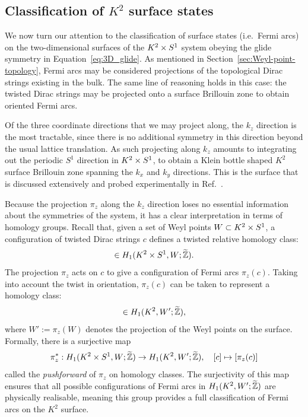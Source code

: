 \subsection{Classification of \texorpdfstring{$K^2$}{K²} surface states}

We now turn our attention to the classification of surface states (i.e.\ Fermi arcs) on the two-dimensional surfaces of the $K^2\times S^1$ system obeying the glide symmetry in Equation~\eqref{eq:3D_glide}. As mentioned in Section~\ref{sec:Weyl-point-topology}, Fermi arcs may be considered projections of the topological Dirac strings existing in the bulk. The same line of reasoning holds in this case: the twisted Dirac strings may be projected onto a surface Brillouin zone to obtain oriented Fermi arcs.

Of the three coordinate directions that we may project along, the $k_z$ direction is the most tractable, since there is no additional symmetry in this direction beyond the usual lattice translation. As such projecting along $k_z$ amounts to integrating out the periodic $S^1$ direction in $K^2\times S^1$, to obtain a Klein bottle shaped $K^2$ surface Brillouin zone spanning the $k_x$ and $k_y$ directions. This is the surface that is discussed extensively and probed experimentally in Ref.~\cite{Fonseca-Vaidya_nonorientable}.

Because the projection $\pi_z$ along the $k_z$ direction loses no essential information about the symmetries of the system, it has a clear interpretation in terms of homology groups. Recall that, given a set of Weyl points $W\subset K^2\times S^1$, a configuration of twisted Dirac strings $c$ defines a twisted relative homology class:
\begin{equation*}
	[c]\in H_1(\KS,W;\ext{\Z}).
\end{equation*}
The projection $\pi_z$ acts on $c$ to give a configuration of Fermi arcs $\pi_z(c)$. Taking into account the twist in orientation, $\pi_z(c)$ can be taken to represent a homology class:
\begin{equation*}
	[\pi_z(c)]\in H_1(K^2,W';\ext{\Z}),
\end{equation*}
where $W':=\pi_z(W)$ denotes the projection of the Weyl points on the surface. Formally, there is a surjective map
\begin{equation*}
	\pi_z^*: H_1(K^2\times S^1,W;\widetilde{\mathbb{Z}}) \to H_1(K^2,W';\widetilde{\mathbb{Z}}),\quad [c] \mapsto [\pi_z(c)]
\end{equation*}
called the \emph{pushforward} of $\pi_z$ on homology classes. The surjectivity of this map ensures that all possible configurations of Fermi arcs in $H_1(K^2,W';\widetilde{\mathbb{Z}})$ are physically realisable, meaning this group provides a full classification of Fermi arcs on the $K^2$ surface.

